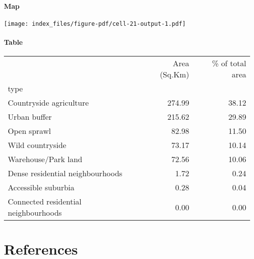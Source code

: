\documentclass[
  letterpaper,
  DIV=11,
  numbers=noendperiod,
  oneside]{scrartcl}
\let\oldparagraph\paragraph
\renewcommand{\paragraph}[1]{\oldparagraph{#1}\mbox{}}
\begin{document}
\hypertarget{map-3}{%
\paragraph{Map}\label{map-3}}

\texttt{[image: index\_files/figure-pdf/cell-21-output-1.pdf]}

\hypertarget{table-3}{%
\paragraph{Table}\label{table-3}}

\begin{tabular}{lrr}
\toprule
{} &  Area (Sq.Km) &  \% of total area \\
type                                 &               &                  \\
\midrule
Countryside agriculture              &        274.99 &            38.12 \\
Urban buffer                         &        215.62 &            29.89 \\
Open sprawl                          &         82.98 &            11.50 \\
Wild countryside                     &         73.17 &            10.14 \\
Warehouse/Park land                  &         72.56 &            10.06 \\
Dense residential neighbourhoods     &          1.72 &             0.24 \\
Accessible suburbia                  &          0.28 &             0.04 \\
Connected residential neighbourhoods &          0.00 &             0.00 \\
\bottomrule
\end{tabular}

\hypertarget{references}{%
\section*{References}\label{references}}
\end{document}
